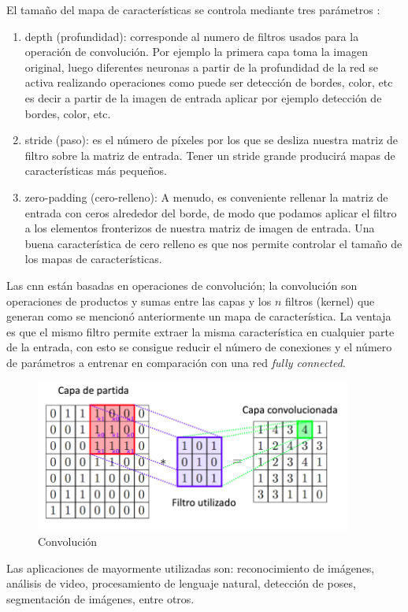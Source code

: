 El tamaño del mapa de características se controla mediante tres parámetros \citep{cnnsarticle}:
\begin{enumerate}
\item depth (profundidad): corresponde al numero de filtros usados para la operación de convolución. Por ejemplo la primera capa toma la imagen original, luego diferentes neuronas a partir de la profundidad de la red se activa realizando operaciones como puede ser detección de bordes, color, etc
es decir a partir de la imagen de entrada aplicar por ejemplo detección de bordes, color, etc.
\item stride (paso): es el número de píxeles por los que se desliza nuestra matriz de filtro sobre la matriz de entrada. Tener un stride grande producirá mapas de características más pequeños.
\item zero-padding (cero-relleno): A menudo, es conveniente rellenar la matriz de entrada con ceros alrededor del borde, de modo que podamos aplicar el filtro a los elementos fronterizos de nuestra matriz de imagen de entrada. Una buena característica de cero relleno es que nos permite controlar el tamaño de los mapas de características.
\end{enumerate}

Las \ac{cnn} están basadas en operaciones de convolución; la convolución son operaciones de productos y sumas entre las capas y los $n $ filtros (kernel) que generan como se mencionó anteriormente un mapa de característica. La ventaja es que el mismo filtro permite extraer la misma característica en cualquier parte de la entrada, con esto se consigue reducir el número de conexiones y el número de parámetros a entrenar en comparación con una red \textit{fully connected}.

\begin{figure}[h]
 \centering
  \includegraphics[height=5cm,keepaspectratio=true,clip=true]{imagenes/MarcoTeorico/convolucion.png}
  \caption{Convolución}
	\label{Fig:convolucion}
\end{figure}
Las aplicaciones de mayormente utilizadas son: reconocimiento de imágenes, análisis de video, procesamiento de lenguaje natural, detección de poses, segmentación de imágenes, entre otros.
